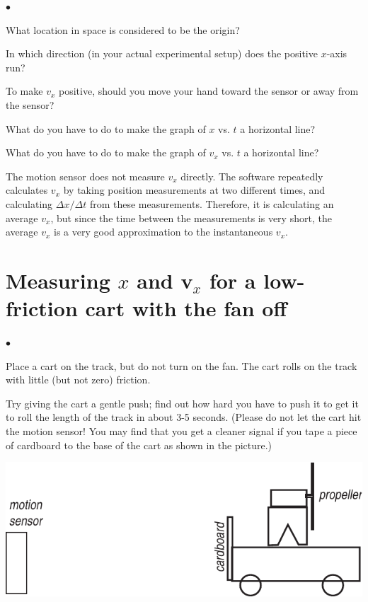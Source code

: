 \documentclass[11pt]{article}
\newcommand{\squishlist}{
   \begin{list}{$\bullet$}
    { \setlength{\itemsep}{0pt}      \setlength{\parsep}{3pt}
      \setlength{\topsep}{3pt}       \setlength{\partopsep}{0pt}
      \setlength{\leftmargin}{1.5em} \setlength{\labelwidth}{1em}
      \setlength{\labelsep}{0.5em} } }
\newcommand{\squishend}{
    \end{list}  }
\begin{document}
\squishlist
\item What location in space is considered to be the origin?
\item In which direction (in your actual experimental setup) does the positive $x$-axis run?
\item To make $v_{x}$ positive, should you move your hand toward the sensor or away from the sensor?
\item What do you have to do to make the graph of $x$ vs. $t$ a horizontal line?
\item What do you have to do to make the graph of $v_{x}$ vs. $t$ a horizontal line?
\squishend

\medskip

The motion sensor does not measure $v_{x}$ directly. The software repeatedly
calculates $v_{x}$ by taking position measurements at two different times,
and calculating $\Delta x/\Delta t$ from these measurements. Therefore, it
is calculating an average $v_{x}$, but since the time between the
measurements is very short, the average $v_{x}$ is a very good approximation
to the instantaneous $v_{x}$.

\newpage

\section{Measuring $x$ and v$_{x}$ for a low-friction cart with the fan off}

\squishlist
\item Place a cart on the track, but do not turn on the fan. The cart rolls on the track with little (but not zero) friction.
\item Try giving the cart a gentle push; find out how hard you have to push it to get it to roll the length of the track in about 3-5 seconds. (Please do not let the cart hit the motion sensor! You may find that you get a cleaner signal if you tape a piece of cardboard to the base of the cart as shown in the picture.)
\squishend

\begin{center}
\vspace{10pt}
\includegraphics[scale=0.75]{fancart_diagr.pdf}
\end{center}
\end{document}
